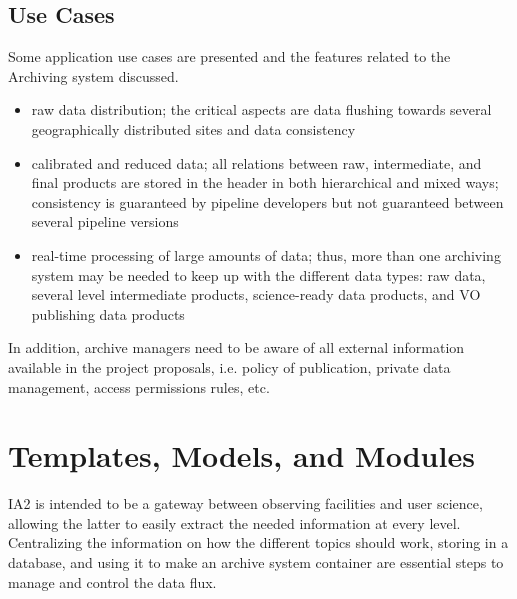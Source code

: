 \subsection{Use Cases}
Some application use cases are presented and the features related to the
Archiving system discussed.
\begin{itemize}
  \item raw data distribution; the critical aspects are data flushing towards
  several geographically distributed sites and data consistency
  \item calibrated and reduced data; all relations between raw, intermediate,
  and final products are stored in the header in both hierarchical and mixed ways;
  consistency is guaranteed by pipeline developers but not guaranteed between
  several pipeline versions
  \item real-time processing of large amounts of data; thus, more than one archiving
  system may be needed to keep up with the different data types: raw data,
  several level intermediate products, science-ready data products, and VO publishing
  data products
\end{itemize}
In addition, archive managers need to be aware of all external information
available in the project proposals, i.e. policy of publication, private
data management, access permissions rules, etc. 

\section{Templates, Models, and Modules}
IA2 is intended to be a gateway between observing facilities and user science,
allowing the latter to easily extract the needed information at every level.
Centralizing the information on how the different topics should work, storing
in a database, and using it to make an archive system container are essential
steps to manage and control the data flux.

